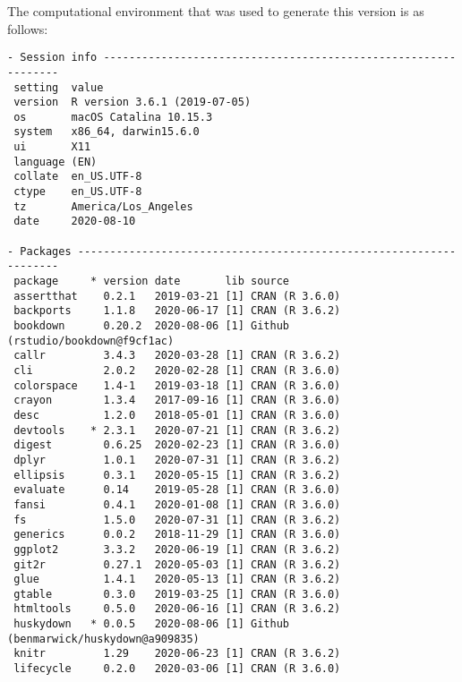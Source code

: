 \documentclass [11pt, proquest] {uwthesis}[2015/03/03]
\begin{document}
The computational environment that was used to generate this version is
as follows:
\begin{verbatim}
- Session info ---------------------------------------------------------------
 setting  value                       
 version  R version 3.6.1 (2019-07-05)
 os       macOS Catalina 10.15.3      
 system   x86_64, darwin15.6.0        
 ui       X11                         
 language (EN)                        
 collate  en_US.UTF-8                 
 ctype    en_US.UTF-8                 
 tz       America/Los_Angeles         
 date     2020-08-10                  

- Packages -------------------------------------------------------------------
 package     * version date       lib source                               
 assertthat    0.2.1   2019-03-21 [1] CRAN (R 3.6.0)                       
 backports     1.1.8   2020-06-17 [1] CRAN (R 3.6.2)                       
 bookdown      0.20.2  2020-08-06 [1] Github (rstudio/bookdown@f9cf1ac)    
 callr         3.4.3   2020-03-28 [1] CRAN (R 3.6.2)                       
 cli           2.0.2   2020-02-28 [1] CRAN (R 3.6.0)                       
 colorspace    1.4-1   2019-03-18 [1] CRAN (R 3.6.0)                       
 crayon        1.3.4   2017-09-16 [1] CRAN (R 3.6.0)                       
 desc          1.2.0   2018-05-01 [1] CRAN (R 3.6.0)                       
 devtools    * 2.3.1   2020-07-21 [1] CRAN (R 3.6.2)                       
 digest        0.6.25  2020-02-23 [1] CRAN (R 3.6.0)                       
 dplyr         1.0.1   2020-07-31 [1] CRAN (R 3.6.2)                       
 ellipsis      0.3.1   2020-05-15 [1] CRAN (R 3.6.2)                       
 evaluate      0.14    2019-05-28 [1] CRAN (R 3.6.0)                       
 fansi         0.4.1   2020-01-08 [1] CRAN (R 3.6.0)                       
 fs            1.5.0   2020-07-31 [1] CRAN (R 3.6.2)                       
 generics      0.0.2   2018-11-29 [1] CRAN (R 3.6.0)                       
 ggplot2       3.3.2   2020-06-19 [1] CRAN (R 3.6.2)                       
 git2r         0.27.1  2020-05-03 [1] CRAN (R 3.6.2)                       
 glue          1.4.1   2020-05-13 [1] CRAN (R 3.6.2)                       
 gtable        0.3.0   2019-03-25 [1] CRAN (R 3.6.0)                       
 htmltools     0.5.0   2020-06-16 [1] CRAN (R 3.6.2)                       
 huskydown   * 0.0.5   2020-08-06 [1] Github (benmarwick/huskydown@a909835)
 knitr         1.29    2020-06-23 [1] CRAN (R 3.6.2)                       
 lifecycle     0.2.0   2020-03-06 [1] CRAN (R 3.6.0)                       

\end{verbatim}
\end{document}
